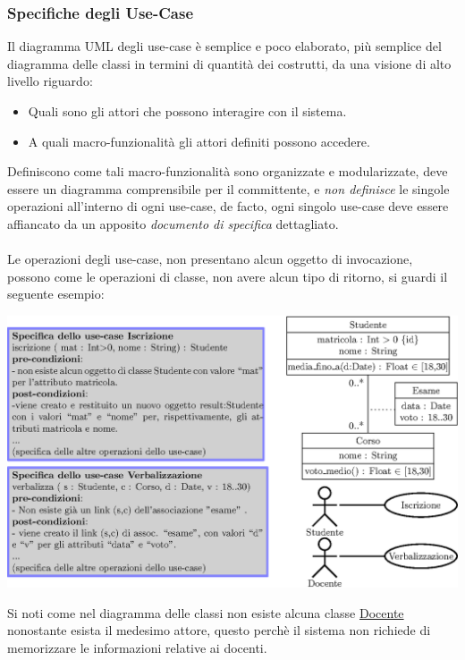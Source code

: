 \documentclass[12pt, letterpaper]{article}
\newcommand{\acc}{\\\hphantom{}\\}
\begin{document}
\subsubsection{Specifiche degli Use-Case}
Il diagramma UML degli use-case è semplice e poco elaborato, più semplice del diagramma delle classi in termini di 
quantità dei costrutti, da una visione di alto livello riguardo:\begin{itemize}
    \item Quali sono gli attori che possono interagire con il sistema.
    \item A quali macro-funzionalità gli attori definiti possono accedere.
\end{itemize}
Definiscono come tali macro-funzionalità sono organizzate e modularizzate, deve essere un diagramma comprensibile per 
il committente, e \textit{non definisce} le singole operazioni all'interno di ogni use-case, de facto, ogni singolo use-case 
deve essere affiancato da un apposito \textit{documento di specifica} dettagliato.\acc 
Le operazioni degli use-case, non presentano alcun oggetto di invocazione, possono come le operazioni di classe, non 
avere alcun tipo di ritorno, si guardi il seguente esempio:\begin{center}
    \includegraphics[width=\textwidth ]{images/specificaUseCase.eps}
\end{center}
Si noti come nel diagramma delle classi non esiste alcuna classe \underline{Docente} nonostante esista il medesimo
attore, questo perchè il sistema non richiede di memorizzare le informazioni relative ai docenti.
\end{document}
